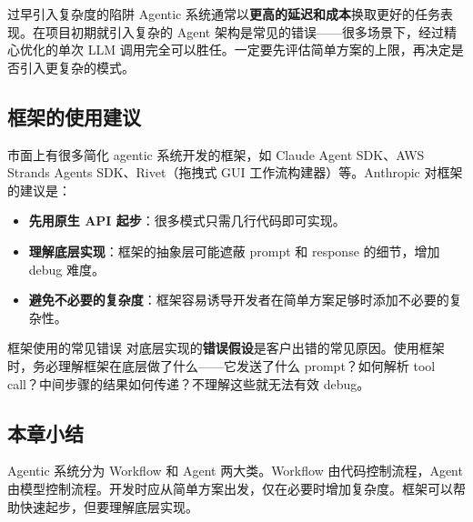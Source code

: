 \begin{warningbox}{过早引入复杂度的陷阱}
Agentic 系统通常以\textbf{更高的延迟和成本}换取更好的任务表现。在项目初期就引入复杂的 Agent 架构是常见的错误——很多场景下，经过精心优化的单次 LLM 调用完全可以胜任。一定要先评估简单方案的上限，再决定是否引入更复杂的模式。
\end{warningbox}

\subsection{框架的使用建议}

市面上有很多简化 agentic 系统开发的框架，如 Claude Agent SDK、AWS Strands Agents SDK、Rivet（拖拽式 GUI 工作流构建器）等。Anthropic 对框架的建议是：

\begin{itemize}
    \item \textbf{先用原生 API 起步}：很多模式只需几行代码即可实现。
    \item \textbf{理解底层实现}：框架的抽象层可能遮蔽 prompt 和 response 的细节，增加 debug 难度。
    \item \textbf{避免不必要的复杂度}：框架容易诱导开发者在简单方案足够时添加不必要的复杂性。
\end{itemize}

\begin{warningbox}{框架使用的常见错误}
对底层实现的\textbf{错误假设}是客户出错的常见原因。使用框架时，务必理解框架在底层做了什么——它发送了什么 prompt？如何解析 tool call？中间步骤的结果如何传递？不理解这些就无法有效 debug。
\end{warningbox}

\subsection{本章小结}
Agentic 系统分为 Workflow 和 Agent 两大类。Workflow 由代码控制流程，Agent 由模型控制流程。开发时应从简单方案出发，仅在必要时增加复杂度。框架可以帮助快速起步，但要理解底层实现。


